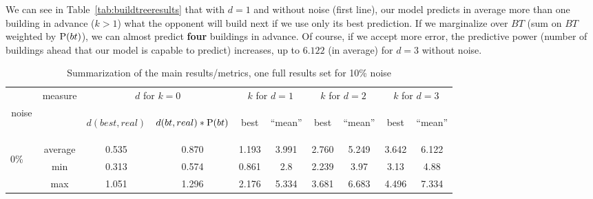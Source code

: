 We can see in Table~\ref{tab:buildtreeresults} that with $d=1$ and without noise (first line), our model predicts in average more than one building in advance ($k>1$) what the opponent will build next if we use only its best prediction. If we marginalize over $BT$ (sum on $BT$ weighted by $\mathrm{P}(bt)$), we can almost predict \textbf{four} buildings in advance. Of course, if we accept more error, the predictive power (number of buildings ahead that our model is capable to predict) increases, up to $6.122$ (in average) for $d=3$ without noise.


\begin{table}[h]
\caption{Summarization of the main results/metrics, one full results set for 10\% noise}
\begin{center}
\begin{footnotesize}
\begin{tabular}{|c|c|cc|cc|cc|cc|}
\hline
  & measure & \multicolumn{2}{|c|}{$d$ for $k=0$} & \multicolumn{2}{|c|}{$k$ for $d=1$} & \multicolumn{2}{|c|}{$k$ for $d=2$} & \multicolumn{2}{|c|}{$k$ for $d=3$} \\
 noise & & \begin{scriptsize}$d(best,real)$\end{scriptsize} 
& \begin{scriptsize}$d(bt,real)*\mathrm{P}(bt)$\end{scriptsize}
& \begin{scriptsize}best\end{scriptsize}
& \begin{scriptsize}``mean''\end{scriptsize}
& \begin{scriptsize}best\end{scriptsize}
& \begin{scriptsize}``mean''\end{scriptsize}
& \begin{scriptsize}best\end{scriptsize}
&  \begin{scriptsize}``mean''\end{scriptsize} \\
\hline
\multirow{3}{3mm}{\begin{sideways}\parbox{3mm}{0\%\ \ }\end{sideways}}
& average & 0.535 & 0.870 & 1.193 & 3.991 & 2.760 & 5.249 & 3.642 & 6.122\\
& min & 0.313 & 0.574 & 0.861 & 2.8 & 2.239 & 3.97 & 3.13 & 4.88\\
& max & 1.051 & 1.296 & 2.176 & 5.334 & 3.681 & 6.683 & 4.496 & 7.334\\

\end{tabular}
\end{footnotesize}
\end{center}
\end{table}
